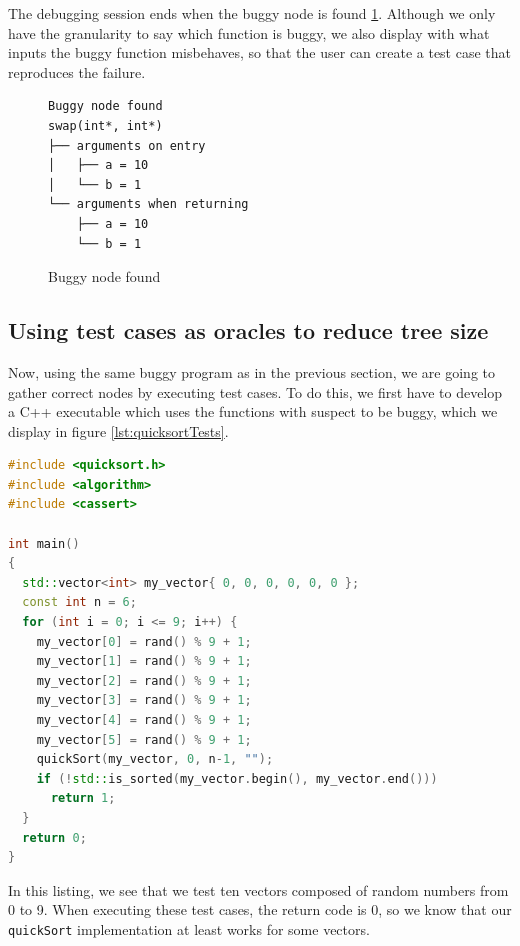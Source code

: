 The debugging session ends when the buggy node is found \ref{fig:buggyNodeFound}. Although we only have the granularity to say which function is buggy, we also display with what inputs the buggy function misbehaves, so that the user can create a test case that reproduces the failure.
\begin{figure}[h]
    \centering
    \caption{Buggy node found}
    \label{fig:buggyNodeFound}
    \begin{verbatim}
Buggy node found
swap(int*, int*)                                                                                                                                      
├── arguments on entry                                                                                                                                
│   ├── a = 10                                                                                                                                        
│   └── b = 1                                                                                                                                         
└── arguments when returning                                                                                                                          
    ├── a = 10                                                                                                                                        
    └── b = 1 
    \end{verbatim}
\end{figure}

\subsection{Using test cases as oracles to reduce tree size}
Now, using the same buggy program as in the previous section, we are going to gather correct nodes by executing test cases.
To do this, we first have to develop a C++ executable which uses the functions with suspect to be buggy, which we display in figure \ref{lst:quicksortTests}.
\begin{lstlisting}[language=C++, caption=Test cases for quickSort, frame=tb, label={lst:quicksortTests}]
#include <quicksort.h>
#include <algorithm>
#include <cassert>

int main()
{
  std::vector<int> my_vector{ 0, 0, 0, 0, 0, 0 };
  const int n = 6;
  for (int i = 0; i <= 9; i++) {
    my_vector[0] = rand() % 9 + 1;
    my_vector[1] = rand() % 9 + 1;
    my_vector[2] = rand() % 9 + 1;
    my_vector[3] = rand() % 9 + 1;
    my_vector[4] = rand() % 9 + 1;
    my_vector[5] = rand() % 9 + 1;
    quickSort(my_vector, 0, n-1, "");
    if (!std::is_sorted(my_vector.begin(), my_vector.end()))
      return 1;
  }
  return 0;
}
\end{lstlisting}
In this listing, we see that we test ten vectors composed of random numbers from 0 to 9. When executing these test cases, the return code is 0, so we know that our \verb|quickSort| implementation at least works for some vectors.

